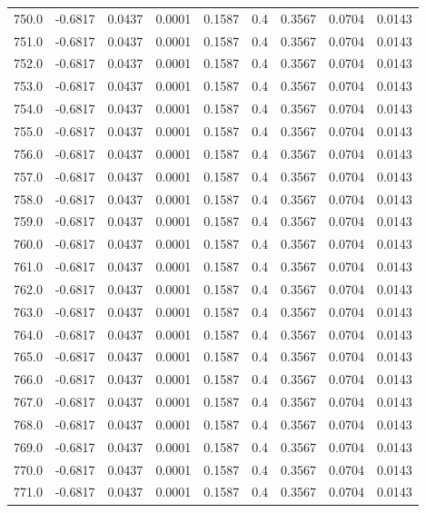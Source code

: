 \begin{longtable}{lrrrrrrrr}
750.0 & -0.6817 & 0.0437 & 0.0001 & 0.1587 & 0.4 & 0.3567 & 0.0704 & 0.0143 \\
751.0 & -0.6817 & 0.0437 & 0.0001 & 0.1587 & 0.4 & 0.3567 & 0.0704 & 0.0143 \\
752.0 & -0.6817 & 0.0437 & 0.0001 & 0.1587 & 0.4 & 0.3567 & 0.0704 & 0.0143 \\
753.0 & -0.6817 & 0.0437 & 0.0001 & 0.1587 & 0.4 & 0.3567 & 0.0704 & 0.0143 \\
754.0 & -0.6817 & 0.0437 & 0.0001 & 0.1587 & 0.4 & 0.3567 & 0.0704 & 0.0143 \\
755.0 & -0.6817 & 0.0437 & 0.0001 & 0.1587 & 0.4 & 0.3567 & 0.0704 & 0.0143 \\
756.0 & -0.6817 & 0.0437 & 0.0001 & 0.1587 & 0.4 & 0.3567 & 0.0704 & 0.0143 \\
757.0 & -0.6817 & 0.0437 & 0.0001 & 0.1587 & 0.4 & 0.3567 & 0.0704 & 0.0143 \\
758.0 & -0.6817 & 0.0437 & 0.0001 & 0.1587 & 0.4 & 0.3567 & 0.0704 & 0.0143 \\
759.0 & -0.6817 & 0.0437 & 0.0001 & 0.1587 & 0.4 & 0.3567 & 0.0704 & 0.0143 \\
760.0 & -0.6817 & 0.0437 & 0.0001 & 0.1587 & 0.4 & 0.3567 & 0.0704 & 0.0143 \\
761.0 & -0.6817 & 0.0437 & 0.0001 & 0.1587 & 0.4 & 0.3567 & 0.0704 & 0.0143 \\
762.0 & -0.6817 & 0.0437 & 0.0001 & 0.1587 & 0.4 & 0.3567 & 0.0704 & 0.0143 \\
763.0 & -0.6817 & 0.0437 & 0.0001 & 0.1587 & 0.4 & 0.3567 & 0.0704 & 0.0143 \\
764.0 & -0.6817 & 0.0437 & 0.0001 & 0.1587 & 0.4 & 0.3567 & 0.0704 & 0.0143 \\
765.0 & -0.6817 & 0.0437 & 0.0001 & 0.1587 & 0.4 & 0.3567 & 0.0704 & 0.0143 \\
766.0 & -0.6817 & 0.0437 & 0.0001 & 0.1587 & 0.4 & 0.3567 & 0.0704 & 0.0143 \\
767.0 & -0.6817 & 0.0437 & 0.0001 & 0.1587 & 0.4 & 0.3567 & 0.0704 & 0.0143 \\
768.0 & -0.6817 & 0.0437 & 0.0001 & 0.1587 & 0.4 & 0.3567 & 0.0704 & 0.0143 \\
769.0 & -0.6817 & 0.0437 & 0.0001 & 0.1587 & 0.4 & 0.3567 & 0.0704 & 0.0143 \\
770.0 & -0.6817 & 0.0437 & 0.0001 & 0.1587 & 0.4 & 0.3567 & 0.0704 & 0.0143 \\
771.0 & -0.6817 & 0.0437 & 0.0001 & 0.1587 & 0.4 & 0.3567 & 0.0704 & 0.0143 \\

\end{longtable}
